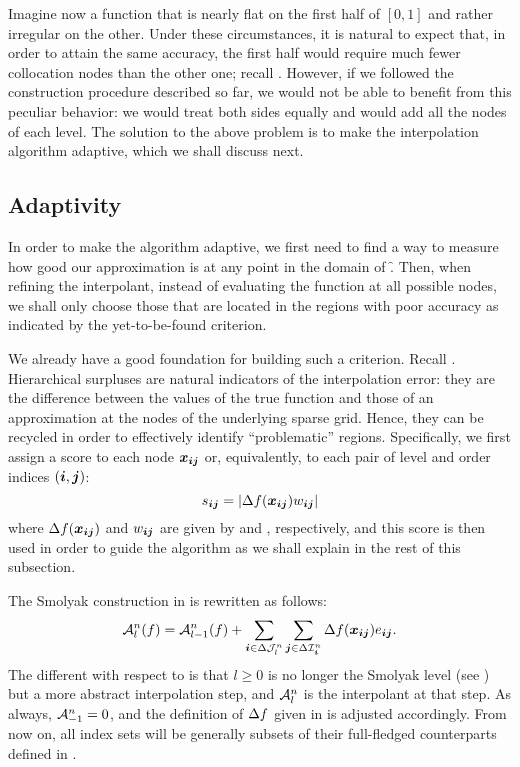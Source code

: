 Imagine now a function that is nearly flat on the first half of $[0, 1]$ and
rather irregular on the other. Under these circumstances, it is natural to
expect that, in order to attain the same accuracy, the first half would require
much fewer collocation nodes than the other one; recall .
However, if we followed the construction procedure described so far, we would
not be able to benefit from this peculiar behavior: we would treat both sides
equally and would add all the nodes of each level. The solution to the above
problem is to make the interpolation algorithm adaptive, which we shall discuss
next.

\subsection{Adaptivity}

In order to make the algorithm adaptive, we first need to find a way to measure
how good our approximation is at any point in the domain of \f. Then, when
refining the interpolant, instead of evaluating the function at all possible
nodes, we shall only choose those that are located in the regions with poor
accuracy as indicated by the yet-to-be-found criterion.

We already have a good foundation for building such a criterion. Recall
. Hierarchical surpluses are natural indicators of the
interpolation error: they are the difference between the values of the true
function and those of an approximation at the nodes of the underlying sparse
grid. Hence, they can be recycled in order to effectively identify
``problematic'' regions. Specifically, we first assign a score to each node
$\boldsymbol{x}_{\boldsymbol{i} \boldsymbol{j}}$ or, equivalently, to each pair of level and order indices $(\boldsymbol{i},
\boldsymbol{j})$:
\[
  s_{\boldsymbol{i} \boldsymbol{j}} = \left| \Delta f(\boldsymbol{x}_{\boldsymbol{i} \boldsymbol{j}}) w_{\boldsymbol{i} \boldsymbol{j}} \right|
\]
where $\Delta f(\boldsymbol{x}_{\boldsymbol{i} \boldsymbol{j}})$ and $w_{\boldsymbol{i}\boldsymbol{j}}$ are given by  and
, respectively, and this score is then used in order to guide the
algorithm as we shall explain in the rest of this subsection.

The Smolyak construction in  is rewritten as follows:
\[
  \mathcal{A}^{n}_{l}(f) = \mathcal{A}^{n}_{l - 1}(f) + \sum_{\boldsymbol{i} \in \Delta\mathcal{J}^{n}_{l}} \sum_{\boldsymbol{j} \in \Delta\mathcal{I}^{n}_{\boldsymbol{i}}} \Delta f(\boldsymbol{x}_{\boldsymbol{i} \boldsymbol{j}}) e_{\boldsymbol{i} \boldsymbol{j}}.
\]
The different with respect to  is that $l \geq 0$ is
no longer the Smolyak level (see ) but a more abstract
interpolation step, and $\mathcal{A}^{n}_{l}$ is the interpolant at that step. As
always, $\mathcal{A}^{n}_{-1} = 0$, and the definition of $\Delta f$ given in
 is adjusted accordingly. From now on, all index sets will be
generally subsets of their full-fledged counterparts defined in .

